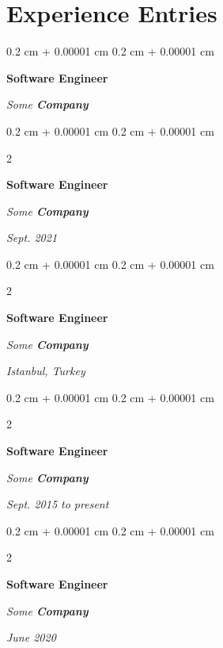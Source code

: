 \documentclass[10pt, letterpaper]{article}
\newenvironment{onecolentry}{
    \begin{adjustwidth}{
        0.2 cm + 0.00001 cm
    }{
        0.2 cm + 0.00001 cm
    }
}{
    \end{adjustwidth}
} %
\newenvironment{twocolentry}[2][]{
    \onecolentry
    \def\secondColumn{#2}
    \setcolumnwidth{\fill, 4.5 cm}
    \begin{paracol}{2}
}{
    \switchcolumn \raggedleft \secondColumn
    \end{paracol}
    \endonecolentry
} %
\begin{document}
    
    \section{Experience Entries}

        
        \begin{onecolentry}
            \textbf{Software Engineer}
            
            \textit{Some \textbf{Company}}
        \end{onecolentry}



        \vspace{0.2 cm-3px}

        \begin{twocolentry}{
            
            
        \textit{Sept. 2021}}
            \textbf{Software Engineer}
            
            \textit{Some \textbf{Company}}
        \end{twocolentry}



        \vspace{0.2 cm-3px}

        \begin{twocolentry}{
        \textit{Istanbul, Turkey}    
            
        }
            \textbf{Software Engineer}
            
            \textit{Some \textbf{Company}}
        \end{twocolentry}



        \vspace{0.2 cm-3px}

        \begin{twocolentry}{
            
            
        \textit{Sept. 2015 to present}}
            \textbf{Software Engineer}
            
            \textit{Some \textbf{Company}}
        \end{twocolentry}



        \vspace{0.2 cm-3px}

        \begin{twocolentry}{
            
            
        \textit{June 2020}}
            \textbf{Software Engineer}
            
            \textit{Some \textbf{Company}}
        \end{twocolentry}
\end{document}
